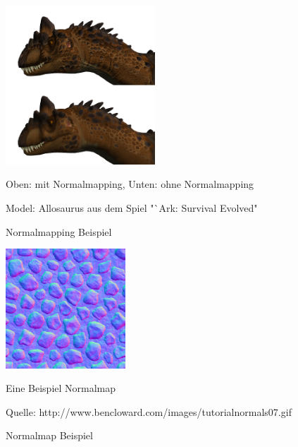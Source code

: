 \begin{figure}
	\begin{center}
		\includegraphics[width=0.5\textwidth]{02theorie/Normalmapping.png}
		
		Oben: mit Normalmapping, Unten: ohne Normalmapping
		
		Model: Allosaurus aus dem Spiel "`Ark: Survival Evolved"
		
		\caption{Normalmapping Beispiel}
		\label{img:Normalmapping}
	\end{center}
\end{figure}
\begin{figure}
	\begin{center}
		\includegraphics[width=0.4\textwidth]{02theorie/normalmap.png}
		
		Eine Beispiel Normalmap
		
		Quelle: http://www.bencloward.com/images/tutorial\textunderscore normals07.gif
		
		\caption{Normalmap Beispiel}
		\label{img:Normalmap}
	\end{center}
\end{figure}